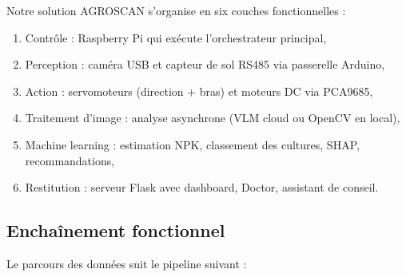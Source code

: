 \documentclass[a4paper,12pt,openany,titlepage]{scrartcl}
\begin{document}
Notre solution AGROSCAN s’organise en six couches fonctionnelles :
\begin{enumerate}[nosep]
    \item Contrôle : Raspberry Pi qui exécute l’orchestrateur principal,
    \item Perception : caméra USB et capteur de sol RS485 via passerelle Arduino,
    \item Action : servomoteurs (direction + bras) et moteurs DC via PCA9685,
    \item Traitement d’image : analyse asynchrone (VLM cloud ou OpenCV en local),
    \item Machine learning : estimation NPK, classement des cultures, SHAP, recommandations,
    \item Restitution : serveur Flask avec dashboard, Doctor, assistant de conseil.
\end{enumerate}

\subsection{Enchaînement fonctionnel}

Le parcours des données suit le pipeline suivant :
\begin{center}
\end{center}
\end{document}
